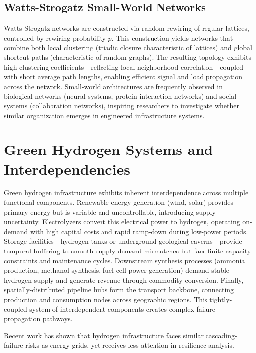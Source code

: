 \documentclass[12pt,a4paper,twoside]{report}
\begin{document}
\subsection{Watts-Strogatz Small-World Networks}

Watts-Strogatz networks are constructed via random rewiring of regular lattices, controlled by rewiring probability $p$. This construction yields networks that combine both local clustering (triadic closure characteristic of lattices) and global shortcut paths (characteristic of random graphs). The resulting topology exhibits high clustering coefficients---reflecting local neighborhood correlation---coupled with short average path lengths, enabling efficient signal and load propagation across the network. Small-world architectures are frequently observed in biological networks (neural systems, protein interaction networks) and social systems (collaboration networks), inspiring researchers to investigate whether similar organization emerges in engineered infrastructure systems.

\section{Green Hydrogen Systems and Interdependencies}

Green hydrogen infrastructure exhibits inherent interdependence across multiple functional components. Renewable energy generation (wind, solar) provides primary energy but is variable and uncontrollable, introducing supply uncertainty. Electrolyzers convert this electrical power to hydrogen, operating on-demand with high capital costs and rapid ramp-down during low-power periods. Storage facilities---hydrogen tanks or underground geological caverns---provide temporal buffering to smooth supply-demand mismatches but face finite capacity constraints and maintenance cycles. Downstream synthesis processes (ammonia production, methanol synthesis, fuel-cell power generation) demand stable hydrogen supply and generate revenue through commodity conversion. Finally, spatially-distributed pipeline hubs form the transport backbone, connecting production and consumption nodes across geographic regions. This tightly-coupled system of interdependent components creates complex failure propagation pathways.

Recent work \citep{karan2021,palomares2022} has shown that hydrogen infrastructure faces similar cascading-failure risks as energy grids, yet receives less attention in resilience analysis.
\end{document}

